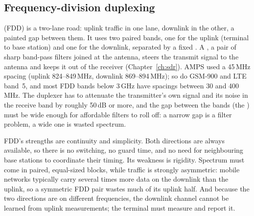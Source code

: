 
\subsection{Frequency-division duplexing}

 (FDD) is a two-lane road: uplink traffic in one lane, downlink in
the other, a painted gap between them. It uses two paired bands, one for the uplink (terminal to
base station) and one for the downlink, separated by a fixed . A
, a pair of sharp band-pass filters joined at the antenna, steers the transmit
signal to the antenna and keeps it out of the receiver (Chapter~\ref{ch:sdr}). AMPS used a
45\,MHz spacing (uplink 824--849\,MHz, downlink 869--894\,MHz); so do GSM-900 and LTE band~5,
and most FDD bands below 3\,GHz have spacings between 30 and 400\,MHz. The duplexer has to
attenuate the transmitter's own signal and its noise in the receive band by roughly 50\,dB or
more, and the gap between the bands (the ) must be wide enough for affordable
filters to roll off: a narrow gap is a filter problem, a wide one is wasted spectrum.

FDD's strengths are continuity and simplicity. Both directions are always available, so there
is no switching, no guard time, and no need for neighbouring base stations to coordinate their
timing. Its weakness is rigidity. Spectrum must come in paired, equal-sized blocks, while
traffic is strongly asymmetric: mobile networks typically carry several times more data on the
downlink than the uplink, so a symmetric FDD pair wastes much of its uplink half. And because
the two directions are on different frequencies, the downlink channel cannot be learned from
uplink measurements; the terminal must measure and report it.


